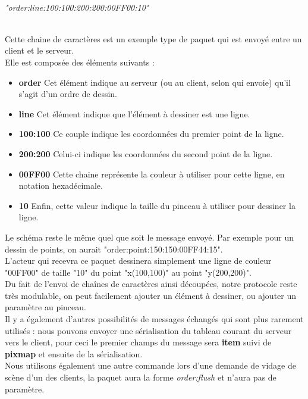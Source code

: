 \documentclass{report}
\begin{document}
\begin{itemize}
				\begin{center}
				$$$$ \\ \textit{\Large{"order:line:100:100:200:200:00FF00:10"}}
				\end{center}
				$$$$ \\
				Cette chaine de caractères est un exemple type de paquet qui est envoyé entre un client et le serveur. \\
				Elle est composée des éléments suivants : \\
				\begin{itemize}
					\item \textbf{order} Cet élément indique au serveur (ou au client, selon qui envoie) qu'il s'agit d'un ordre de dessin. \\
					\item \textbf{line} Cet élément indique que l'élément à dessiner est une ligne. \\
					\item \textbf{100:100} Ce couple indique les coordonnées du premier point de la ligne. \\
					\item \textbf{200:200} Celui-ci indique les coordonnées du second point de la ligne. \\
					\item \textbf{00FF00} Cette chaine représente la couleur à utiliser pour cette ligne, en notation hexadécimale. \\
					\item \textbf{10} Enfin, cette valeur indique la taille du pinceau à utiliser pour dessiner la ligne. \\
				\end{itemize}
				Le schéma reste le même quel que soit le message envoyé. Par exemple pour un dessin de points, on aurait "order:point:150:150:00FF44:15". \\
				L'acteur qui recevra ce paquet dessinera simplement une ligne de couleur "00FF00" de taille "10" du point "x(100,100)" au point "y(200,200)". \\
				Du fait de l'envoi de chaînes de caractères ainsi découpées, notre protocole reste très modulable, on peut facilement ajouter un élément à dessiner, ou ajouter un paramètre au pinceau. \\
				Il y a également d'autres possibilités de messages échangés qui sont plus rarement utilisés : nous pouvons envoyer une sérialisation du tableau courant du serveur vers le client, pour ceci le premier champs du message sera \textbf{item} suivi de \textbf{pixmap} et ensuite de la sérialisation. \\
				Nous utilisons également une autre commande lors d'une demande de vidage de scène d'un des clients, la paquet aura la forme \textit{order:flush} et n'aura pas de paramètre. \\
				
				\end{itemize}
\end{document}
